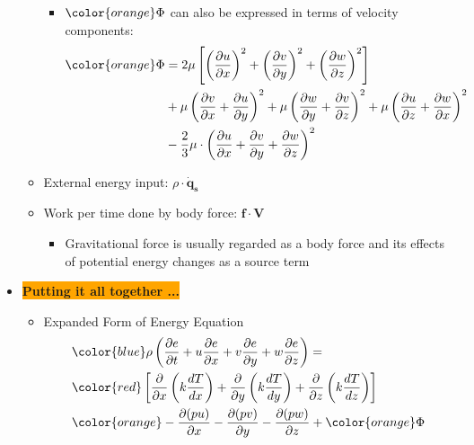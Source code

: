 \begin{itemize}
\begin{itemize}
\begin{itemize}
            \item ${\color{orange}\Phi}$ can also be expressed in terms of velocity components:
            \begin{align*}
                {\color{orange}\Phi} &= 2\mu  \left[ \left( \frac{\partial u}{\partial x} \right)^2 + \left( \frac{\partial v}{\partial y} \right)^2 + \left( \frac{\partial w}{\partial z} \right)^2 \right] \\
                &+ \mu \left( \frac{\partial v}{\partial x} +  \frac{\partial u}{\partial y} \right)^2 + \mu \left( \frac{\partial w}{\partial y} + \frac{\partial v}{\partial z} \right)^2 + \mu \left( \frac{\partial u}{\partial z} +  \frac{\partial w}{\partial x} \right)^2 \\
                &- \frac{2}{3}\mu  \cdot \left( \frac{\partial u}{\partial x} + \frac{\partial v}{\partial y} + \frac{\partial w}{\partial z} \right)^2
            \end{align*}
        \end{itemize}
        \item External energy input: $\rho \cdot \bm{\dot{q}_s}$
        \item Work per time done by body force: $\bm{f} \cdot \bm{V}$
        \begin{itemize}
            \item Gravitational force is usually regarded as a body force and its effects of potential energy changes as a source term
        \end{itemize}
    \end{itemize}
    \item \colorbox{orange}{\textbf{\color{white}Putting it all together ...}}
    \begin{itemize}
        \item Expanded Form of Energy Equation
        \begin{align*}
            & {\color{blue}\rho \left( \frac{\partial e}{\partial t} + u \frac{\partial e}{\partial x} + v \frac{\partial e}{\partial y} + w \frac{\partial e}{\partial z} \right) } = \\ 
            & {\color{red}\left[\frac{\partial}{\partial x}\left(k \frac{dT}{dx}\right) + \frac{\partial}{\partial y}\left(k \frac{dT}{dy}\right)+ \frac{\partial}{\partial z}\left(k \frac{dT}{dz}\right)\right]} \\
            & {\color{orange}- \frac{\partial (p u)}{\partial x} - \frac{\partial (p v)}{\partial y} - \frac{\partial (p w)}{\partial z}} + {\color{orange}\Phi} \\

\end{align*}
\end{itemize}
\end{itemize}
